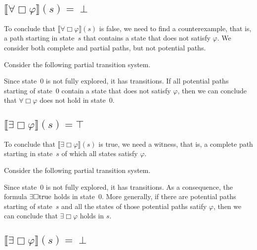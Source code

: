 \documentclass[12pt]{article}
\newcommand{\always}{\Box}
\newcommand{\TRUE}{\mbox{\lstinline{true}}}
\theoremstyle{definition}
\newcommand{\satisfaction}[1]{\llbracket #1 \rrbracket}
\newenvironment{franck}{\color{red}}{\color{black}}
\begin{document}
\begin{franck}
\subsection*{$\satisfaction{\forall \always \varphi}(s) = \perp$}

To conclude that $\satisfaction{\forall \always \varphi}(s)$ is false, we need to find a counterexample, that is, a path starting in state~$s$ that contains a state that does not satisfy $\varphi$.  We consider both complete and partial paths, but not potential paths.

Consider the following partial transition system.
\begin{center}
\end{center}
Since state~0 is not fully explored, it has transitions.  If all potential paths starting of state~0 contain a state that does not satisfy $\varphi$, then we can conclude that $\forall \always \varphi$ does not hold in state~0.

\subsection*{$\satisfaction{\exists \always \varphi}(s) = \top$}

To conclude that $\satisfaction{\exists \always \varphi}(s)$ is true, we need a witness, that is, a complete path starting in state~$s$ of which all states satisfy $\varphi$.  

Consider the following partial transition system.
\begin{center}
\end{center}
Since state~0 is not fully explored, it has transitions.  As a consequence, the formula $\exists \always \TRUE$ holds in state~0.  More generally, if there are potential paths starting of state~$s$ and all the states of those potential paths satify $\varphi$, then we can conclude that $\exists \always \varphi$ holds in $s$.

\subsection*{$\satisfaction{\exists \always \varphi}(s) = \perp$}


\end{franck}
\end{document}
